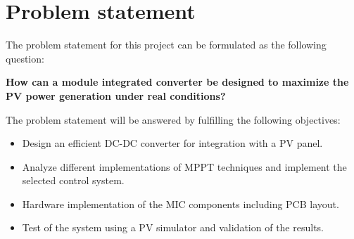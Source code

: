 \newpage
\section{Problem statement}

The problem statement for this project can be formulated as the following question: 

\textbf{How can a module integrated converter be designed to maximize the PV power generation under real conditions?}

The problem statement will be answered by fulfilling the following objectives: 

\begin{itemize}
	\item Design an efficient DC-DC converter for integration with a PV panel.
	\item Analyze different implementations of MPPT techniques and implement the selected control system. 
	\item Hardware implementation of the MIC components including PCB layout.
	\item Test of the system using a PV simulator and validation of the results. 
\end{itemize}